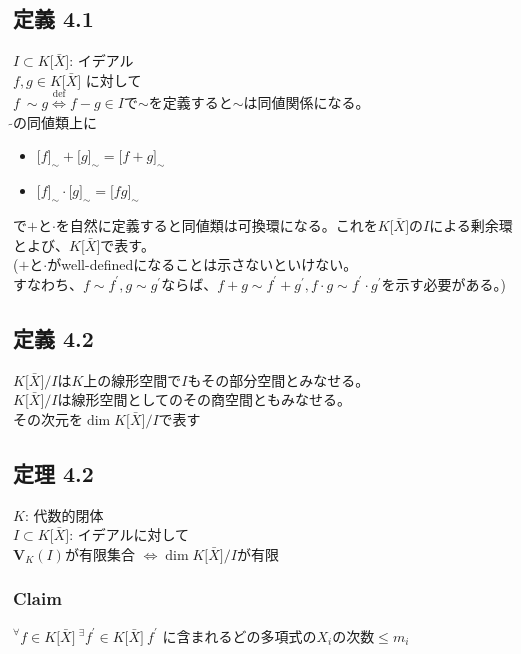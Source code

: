\documentclass[12pt,a4paper]{article}
\begin{document}
\subsection*{定義 4.1}
  $I \subset K \lbrack \bar X \rbrack$: イデアル \\
  $f, g \in K \lbrack \bar X \rbrack$ に対して\\
  $f \ \sim g \overset{\text{def}}{\Leftrightarrow} f- g \in I$で$\sim$を定義すると$\sim$は同値関係になる。\\
  $\tilde{}$の同値類上に
  \begin{itemize}
    \item $\lbrack f \rbrack_{\sim} + \lbrack g \rbrack_{\sim} = \lbrack f + g \rbrack_{\sim} $
    \item $\lbrack f \rbrack_{\sim} \cdot \lbrack g \rbrack_{\sim} = \lbrack f g \rbrack_{\sim} $
  \end{itemize}
  で$+$と$\cdot$を自然に定義すると同値類は可換環になる。これを$K\lbrack \bar X \rbrack$の$I$による剰余環とよび、$K\lbrack \bar X \rbrack$で表す。 \\
  ($+$と$\cdot$がwell-definedになることは示さないといけない。\\ すなわち、$f \sim f^\prime, g \sim g^\prime$ならば、$f + g \sim f^\prime + g^\prime, f\cdot g \sim f^\prime \cdot g^\prime $を示す必要がある。)
\subsection*{定義 4.2}
  $K\lbrack \bar X \rbrack / I $は$K$上の線形空間で$I$もその部分空間とみなせる。\\
  $K \lbrack \bar X \rbrack / I $は線形空間としてのその商空間ともみなせる。\\
  その次元を$\dim K \lbrack \bar X \rbrack / I$で表す
\subsection*{定理 4.2}
  $K$: 代数的閉体 \\
  $I \subset K \lbrack \bar X \rbrack$: イデアルに対して\\
  $\mathbf{V}_K (I)$が有限集合 $\Leftrightarrow \dim K\lbrack \bar X \rbrack / I$が有限
  \subsubsection*{Claim}
    ${}^\forall f \in K \lbrack \bar{X} \rbrack \ {}^\exists f^\prime \in K \lbrack \bar{X} \rbrack \ f^\prime$ に含まれるどの多項式の$X_i$の次数$ \leq m_i$
\end{document}
